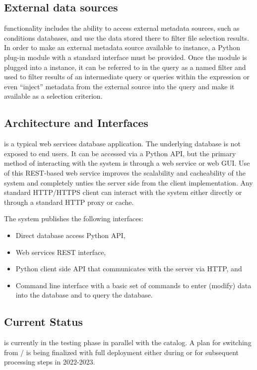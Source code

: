 \documentclass[../main-v1.tex]{subfiles}
\begin{document}
\subsection{External data sources }
   functionality includes the ability to access external metadata sources, such as conditions databases, and use the data stored there to filter file selection results. In order to make an external metadata source available to  instance,  a Python plug-in module with a standard interface must be provided.  Once the module is plugged into a  instance, it can be referred to in the  query as a named filter  and used to filter results of an intermediate query or queries within the  expression or even ``inject'' metadata from the external source into the query and make it available as a  selection criterion. 

\subsection{Architecture and Interfaces}
 is a typical web services database application. The underlying database is not exposed to end users. It can be accessed via a Python API, but the primary method of interacting with the system is through a web service or web GUI. Use of this REST-based web service 
improves the scalability and cacheability of the system and completely unties the server side from the client implementation. Any standard HTTP/HTTPS client can interact with the system either directly or through a standard HTTP proxy or cache. 


The system publishes the following interfaces: 
\begin{itemize} 
\item Direct database access Python API, 

\item Web services REST interface, 

\item Python client side API that communicates with the server via HTTP, and 

\item 
Command line interface with a basic set of commands to enter (modify) data into the database and to query the database. 
\end{itemize}


\subsection{Current Status} 
 is currently in the testing phase in parallel with the  catalog.  A plan for switching from / is being finalized with full deployment either during  or for subsequent processing steps in 2022-2023. 
\end{document}
